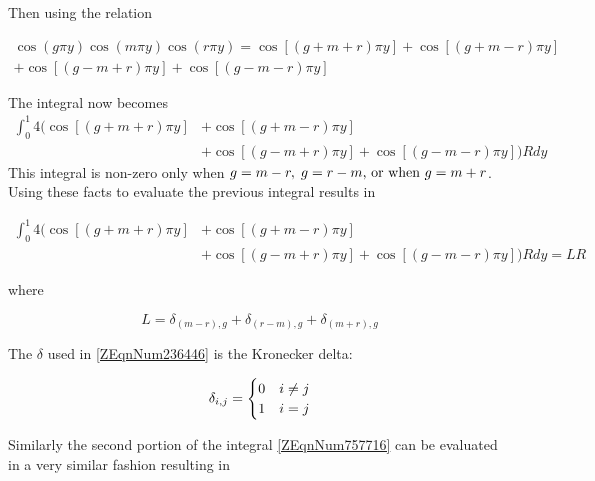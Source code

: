 Then using the relation

\begin{equation*}
    \begin{array}{l} {\cos \left(g\pi y\right)\cos \left(m\pi y\right)\cos
    \left(r\pi y\right)=\cos \left[\left(g+m+r\right)\pi y\right]+\cos
    \left[\left(g+m-r\right)\pi y\right]} \\ {+\cos \left[\left(g-m+r\right)\pi
    y\right]+\cos \left[\left(g-m-r\right)\pi y\right]} \end{array} 
\end{equation*}

The integral now becomes 
\begin{equation*} \begin{split}
    \int_{0}^{1} 4(\cos \left[\left(g + m + r\right) \pi y\right]
    & + \cos \left[\left(g + m - r\right)\pi y\right] \\
    & + \cos \left[\left(g - m + r\right)\pi y\right]
    + \cos \left[\left(g - m - r\right)\pi y\right] ) Rdy 
\end{split} \end{equation*}
This integral is non-zero only when $g = m - r , \; 
g = r - m \text{, or when } g = m + r$. Using these facts to evaluate the previous
integral results in

\begin{equation*} \begin{split}
    \int _{0}^{1} 4 (\cos \left[\left(g + m + r\right)\pi y\right]
    & + \cos \left[\left(g + m - r\right) \pi y\right] \\
    & + \cos \left[\left(g - m + r\right) \pi y\right]
    + \cos \left[\left(g - m - r\right) \pi y\right] ) R dy = LR
\end{split} \end{equation*} 

where

\begin{equation} \label{ZEqnNum236446} L=\delta _{\left(m-r\right),g} +\delta
_{\left(r-m\right),g} +\delta _{\left(m+r\right),g} \end{equation}

The $\delta $ used in \eqref{ZEqnNum236446} is the Kronecker delta:

\begin{equation*}
    \delta _{i,j} = \begin{cases} 0 & i \ne j \\ 1 & i = j \end{cases}
\end{equation*}

Similarly the second portion of the integral \eqref{ZEqnNum757716} can be
evaluated in a very similar fashion resulting in

